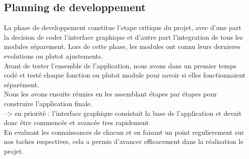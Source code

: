 \documentclass[a4]{article}
\begin{document}
		\subsection{Planning de developpement}
		La phase de developpement constitue l’etape critique du projet, avec d’une part la decision de coder l’interface graphique
et d’autre part l’integration de tous les modules séparement. Lors de cette phase, les modules ont connu leurs dernieres evolutions ou plutot ajustements. \\
Avant de tester l’ensemble de l’application, nous avons dans un premier temps codé et
testé chaque fonction ou plutot module pour savoir si elles fonctionnaient séparément. \\
Nous les avons ensuite
réunies en les assemblant étapes par étapes pour construire l’application finale.  \\
--> en priorité : l'interface graphique consistait la base de l'application et devait donc être commencée et avancée tres rapidement \\
En evaluant les connaissances de chacun et en faisant un point regulierement sur nos taches respectives, cela a permis 
d'avancer efficacement dans la réalisation le projet.
\end{document}
